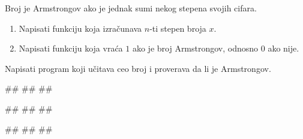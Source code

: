 \begin{Exercise}[label=p1.4_15]
 Broj je Armstrongov ako je jednak sumi nekog stepena svojih cifara.
\begin{enumerate}
\item Napisati funkciju  koja
  izračunava $n$-ti stepen broja $x$.
\item Napisati funkciju  koja vraća $1$
  ako je broj Armstrongov, odnosno $0$ ako nije.
\end{enumerate}
Napisati program koji učitava ceo broj i proverava da li je
Armstrongov.

\begin{miditest}
\begin{upotreba}{1}
#\naslovInt#
##
##
\end{upotreba}
\end{miditest}
\begin{miditest}
\begin{upotreba}{2}
#\naslovInt#
##
##
\end{upotreba}
\end{miditest}

\begin{miditest}
\begin{upotreba}{3}
#\naslovInt#
##
##
\end{upotreba}
\end{miditest}

\end{Exercise}
\begin{Answer}[ref=p1.4_15]
\end{Answer}


